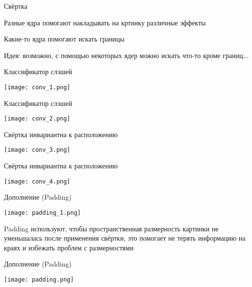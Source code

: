 \documentclass[notes,12pt, aspectratio=169]{beamer}
\newenvironment{wideitemize}{\itemize\addtolength{\itemsep}{10pt}}{\enditemize}
\begin{document}
\begin{frame}{Свёртка}
\begin{wideitemize}
	\item Разные ядра помогают накладывать на кртинку различные эффекты
	\item Какие-то ядра помогают искать границы
	\item \alert{Идея:} возможно, с помощью некоторых ядер можно искать что-то кроме границ...
\end{wideitemize}
\end{frame}



\begin{frame}{Классификатор слэшей}
\begin{center}
	\texttt{[image: conv\_1.png]}
\end{center}
\end{frame}


\begin{frame}{Классификатор слэшей}
\begin{center}
	\texttt{[image: conv\_2.png]}
\end{center}
\end{frame}


\begin{frame}{Свёртка инвариантна к расположению}
\begin{center}
	\texttt{[image: conv\_3.png]}
\end{center}
\end{frame}


\begin{frame}{Свёртка инвариантна к расположению}
\begin{center}
	\texttt{[image: conv\_4.png]}
\end{center}
\end{frame}


\begin{frame}{Дополнение (Padding)}
\begin{center}
	\texttt{[image: padding\_1.png]}
\end{center}
\vfill
\alert{Padding} используют, чтобы пространственная размерность картинки не уменьшалась после применения свёртки, это помогает не терять информацию на краях и избежать проблем с размерностями
\end{frame}


\begin{frame}{Дополнение (Padding)}
\begin{center}
	\texttt{[image: padding.png]}
\end{center}
\end{frame}
\end{document}
